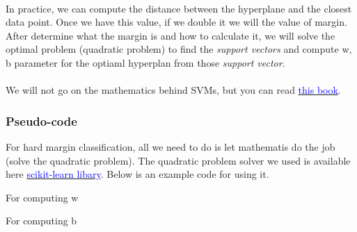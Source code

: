 \paragraph*{}
In practice, we can compute the distance between the hyperplane and the closest data point. Once we have this value, if we double it we will the value of margin. After determine what the margin is and how to calculate it, we will solve the optimal problem (quadratic problem) to find the \textit{support vectors} and compute w, b parameter for the optiaml hyperplan from those \textit{support vector}.

\paragraph*{}
We will not go on the mathematics behind SVMs, but you can read \href{https://www.svm-tutorial.com/2017/10/support-vector-machines-succinctly-released/}{\textcolor{blue}{this book}}.

\subsubsection*{Pseudo-code}
For hard margin classification, all we need to do is let mathematis do the job (solve the quadratic problem). The quadratic problem solver we used is available here \href{http://cvxopt.org/}{\textcolor{blue}{scikit-learn libary}}. Below is an example code for using it.

For computing w

For computing b


